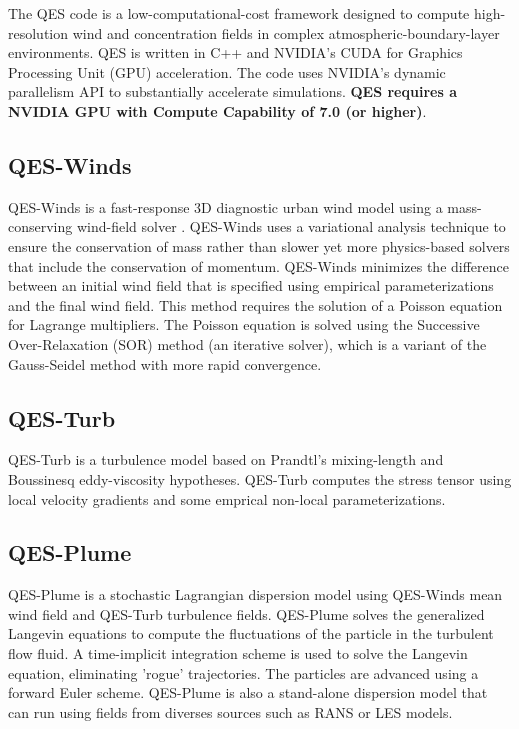 The QES code is a low-computational-cost framework designed to compute high-resolution wind and concentration fields in complex atmospheric-boundary-layer environments. QES is written in C++ and NVIDIA's CUDA for Graphics Processing Unit (GPU) acceleration. The code uses NVIDIA's dynamic parallelism API to substantially accelerate simulations. \textbf{QES requires a NVIDIA GPU with Compute Capability of 7.0 (or higher)}.


\subsection{QES-Winds}

QES-Winds is a fast-response 3D diagnostic urban wind model using a mass-conserving wind-field solver \cite{Bozorgmehr2021}. QES-Winds uses a variational analysis technique to ensure the conservation of mass rather than slower yet more physics-based solvers that include the conservation of momentum. QES-Winds minimizes the difference between an initial wind field that is specified using empirical parameterizations and the final wind field. This method requires the solution of a Poisson equation for Lagrange multipliers. The Poisson equation is solved using the Successive Over-Relaxation (SOR) method (an iterative solver), which is a variant of the Gauss-Seidel method with more rapid convergence.

\subsection{QES-Turb}

QES-Turb is a turbulence model based on Prandtl’s mixing-length and Boussinesq eddy-viscosity hypotheses. QES-Turb computes the stress tensor using local velocity gradients and some emprical non-local parameterizations.

\subsection{QES-Plume}

QES-Plume is a stochastic Lagrangian dispersion model using QES-Winds mean wind field and QES-Turb turbulence fields. QES-Plume solves the generalized Langevin equations to compute the fluctuations of the particle in the turbulent flow fluid. A time-implicit integration scheme is used to solve the Langevin equation, eliminating 'rogue' trajectories. The particles are advanced using a forward Euler scheme. QES-Plume is also a stand-alone dispersion model that can run using fields from diverses sources such as RANS or LES models.


